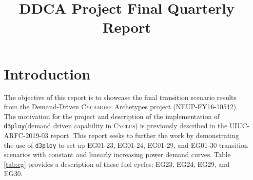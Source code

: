 \documentclass[11pt]{article}
\newcommand{\Cyclus}{\textsc{Cyclus}\xspace}%
\newcommand{\Cycamore}{\textsc{Cycamore}\xspace}%
\newcommand{\deploy}{\texttt{d3ploy}\xspace}%
\begin{document}
\title{DDCA Project Final Quarterly Report}
\maketitle
\tableofcontents

\pagebreak

\section{Introduction}
The objective of this report is to showcase the final transition 
scenario results from the Demand-Driven \Cycamore Archetypes project 
(NEUP-FY16-10512). 
The motivation for the project and description of the implementation 
of \deploy (demand driven capability in \Cyclus) is previously 
described in the UIUC-ARFC-2019-03 report. 
This report seeks to further the work by demonstrating the use of 
\deploy to set up EG01-23, EG01-24, EG01-29, and EG01-30 
transition scenarios with constant and linearly increasing 
power demand curves.
Table \ref{tab:eg} provides a description of these fuel cycles:
EG23, EG24, EG29, and EG30. 
\end{document}
